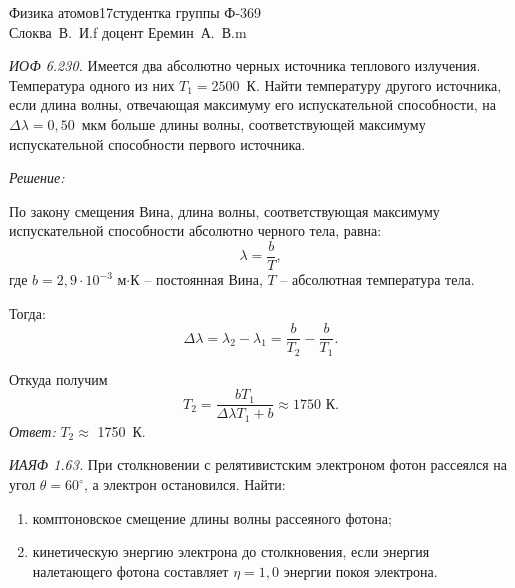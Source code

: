 



\renewcommand{\labelenumi}{\asbuk{enumi})}


{Физика атомов}{}{17}{студентка группы Ф-369\\Слоква~В.~И.}{f}
{доцент Еремин~А.~В.}{m}
\newpage

\emph{ИОФ 6.230.}
Имеется два абсолютно черных источника теплового излучения. Температура
одного из них \( T_1 = 2500 \)~К. Найти температуру другого источника, если
длина волны, отвечающая максимуму его испускательной способности, на
\( \Delta\lambda = 0,50 \)~мкм больше длины волны, соответствующей максимуму
испускательной способности первого источника.

\vspace*{2em}
\emph{Решение:}

По закону смещения Вина, длина волны, соответствующая максимуму
испускательной способности абсолютно черного тела, равна:
\[
  \lambda = \frac{b}{T},
\]
где \( b = 2,9 \cdot 10^{-3} \) м\(\cdot\)К -- постоянная Вина,
\( T \) -- абсолютная температура тела.

Тогда:
\[
  \Delta\lambda = \lambda_2 - \lambda_1 = \frac{b}{T_2} - \frac{b}{T_1}.
\]

Откуда получим
\[
  T_2 = \frac{bT_1}{\Delta\lambda T_1 + b} \approx 1750 \text{ К}.
\]
\vspace*{2em}
\emph{Ответ:}
\( T_2 \approx \) 1750~К.
\newpage

\emph{ИАЯФ 1.63.}
При столкновении с релятивистским электроном фотон рассеялся
на угол \( \theta = 60^\circ \), а электрон остановился. Найти:
\vspace*{-.9em}
\begin{enumerate} \itemsep-.5em
    \item комптоновское смещение длины волны рассеяного фотона;
    \item кинетическую энергию электрона до столкновения, если энергия
    налетающего фотона составляет \( \eta = 1,\!0 \) энергии покоя электрона.
\end{enumerate}

